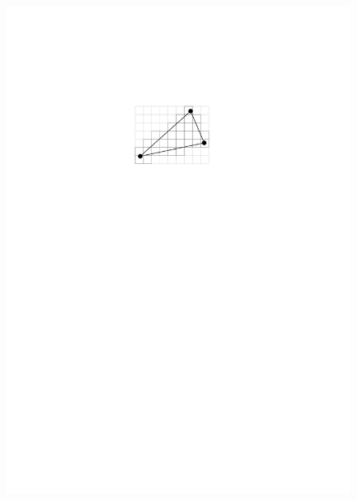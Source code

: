 \documentclass[twoside,a4paper,fleqn,12pt]{article}
\begin{document}
\begin{figure}[h]
  \includegraphics[scale=0.8]{triraster2}
  \qquad

\end{figure}
\end{document}
